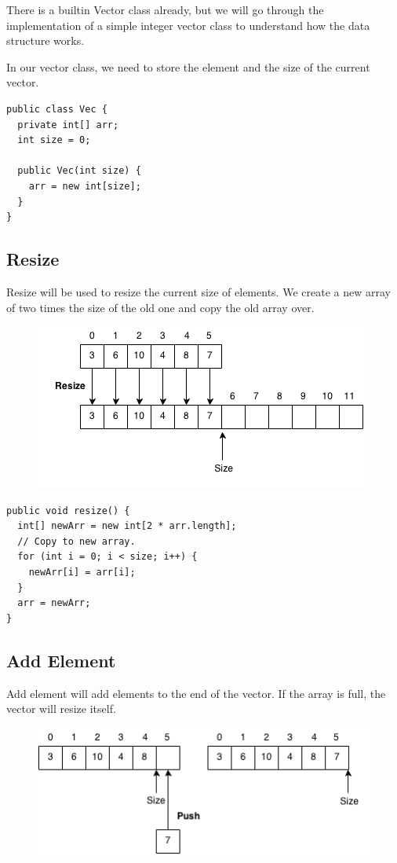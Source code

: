 \documentclass[11pt,oneside]{book}
\makeatletter
\def\maxwidth#1{\ifdim\Gin@nat@width>#1 #1\else\Gin@nat@width\fi}
\makeatother
\begin{document}
There is a builtin Vector class already, but we will go through the implementation of a simple integer vector class to understand how the data structure works.

In our vector class, we need to store the element and the size of the current vector.

\begin{lstlisting}
public class Vec {
  private int[] arr;
  int size = 0;

  public Vec(int size) {
    arr = new int[size];
  }
}
\end{lstlisting}

\subsection{Resize}

Resize will be used to resize the current size of elements. We create a new array of two times the size of the old one and copy the old array over.

\vspace{5px}\begin{figure}[H]\centering
        \includegraphics[width=0.66\maxwidth{\textwidth}]{vector3.png}
        \end{figure}

\begin{lstlisting}
public void resize() {
  int[] newArr = new int[2 * arr.length];
  // Copy to new array.
  for (int i = 0; i < size; i++) {
    newArr[i] = arr[i];
  }
  arr = newArr;
}
\end{lstlisting}

\subsection{Add Element}

Add element will add elements to the end of the vector. If the array is full, the vector will resize itself.

\vspace{5px}\begin{figure}[H]\centering
        \includegraphics[width=0.66\maxwidth{\textwidth}]{vector2.png}
        \end{figure}
\end{document}
